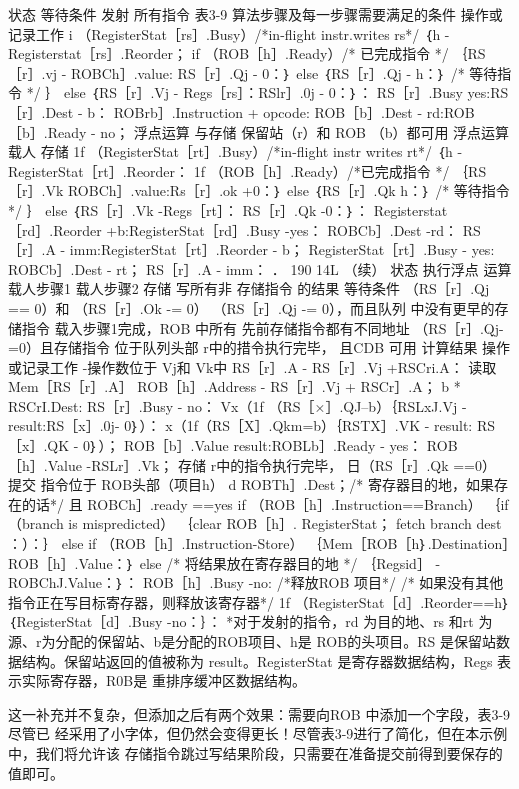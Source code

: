 状态
等待条件
发射
所有指令
表3-9 算法步骤及每一步骤需要满足的条件
操作或记录工作
i （RegisterStat［rs］.Busy）/*in-flight instr.writes rs*/
｛h - Registerstat［rs］.Reorder；
if （ROB［h］.Ready）/* 已完成指令 */
｛RS［r］.vj - ROBCh］.value: RS［r］.Qj - 0：｝
else ｛RS［r］.Qj - h：｝ /* 等待指令 */
｝ else ｛RS［r］.Vj - Regs［rs］：RSlr］.0j - 0：｝：
RS［r］.Busy  yes:RS［r］.Dest - b：
ROBrb］.Instruction + opcode: ROB［b］.Dest - rd:ROB［b］.Ready - no；
浮点运算
与存储
保留站（r）和 ROB
（b）都可用
浮点运算
载人
存储
1f （RegisterStat［rt］.Busy）/*in-flight instr writes rt*/
｛h -RegisterStat［rt］.Reorder：
1f （ROB［h］.Ready）/*已完成指令 */
｛RS［r］.Vk ROBCh］.value:Rs［r］.ok +0：｝
else ｛RS［r］.Qk h：｝ /* 等待指令*/
｝ else ｛RS［r］.Vk -Regs［rt］： RS［r］.Qk -0：｝：
Registerstat［rd］.Reorder +b:RegisterStat［rd］.Busy -yes：
ROBCb］.Dest -rd：
RS［r］.A - imm:RegisterStat［rt］.Reorder - b；
RegisterStat［rt］.Busy - yes: ROBCb］.Dest - rt；
RS［r］.A - imm：
．
190
14L
（续）
状态
执行浮点
运算
载人步骤1
载人步骤2
存储
写所有非
存储指令
的结果
等待条件
（RS［r］.Qj == 0）和
（RS［r］.Ok -= 0）
（RS［r］.Qj -= 0），而且队列
中没有更早的存储指令
载入步骤1完成，ROB 中所有
先前存储指令都有不同地址
（RS［r］.Qj-=0）且存储指令
位于队列头部
r中的措令执行完毕，
且CDB 可用
计算结果
操作或记录工作
-操作数位于 Vj和 Vk中
RS［r］.A - RS［r］.Vj +RSCri.A：
读取 Mem［RS［r］.A］
ROB［h］.Address - RS［r］.Vj + RSCr］.A；
b * RSCrI.Dest: RS［r］.Busy - no：
Vx（1f （RS［×］.QJ--b）｛RSLxJ.Vj - result:RS［x］.0j- 0｝）：
x（1f（RS［X］.Qkm=b）｛RSTX］.VK - result: RS［x］.QK - 0｝）；
ROB［b］.Value result:ROBLb］.Ready - yes：
ROB［h］.Value -RSLr］.Vk；
存储
r中的指令执行完毕，
日（RS［r］.Qk ==0）
提交
指令位于 ROB头部（项目h）
d ROBTh］.Dest；/* 寄存器目的地，如果存在的话*/
且 ROBCh］.ready ==yes
if （ROB［h］.Instruction==Branch）
｛if （branch is mispredicted）
｛clear ROB［h］. RegisterStat； fetch branch dest ：）：｝
else if （ROB［h］.Instruction-Store）
｛Mem［ROB［h｝.Destination］ROB［h］.Value：｝
else /* 将结果放在寄存器目的地 */
｛Regsid］ -ROBChJ.Value：｝：
ROB［h］.Busy -no: /*释放ROB 项目*/
/* 如果没有其他指令正在写目标寄存器，则释放该寄存器*/
1f （RegisterStat［d］.Reorder==h｝｛RegisterStat［d］.Busy -no：｝：
*对于发射的指令，rd 为目的地、rs 和rt 为源、r为分配的保留站、b是分配的ROB项目、h是 ROB的头项目。RS
是保留站数据结构。保留站返回的值被称为 result。RegisterStat 是寄存器数据结构，Regs 表示实际寄存器，R0B是
重排序缓冲区数据结构。

这一补充并不复杂，但添加之后有两个效果：需要向ROB 中添加一个字段，表3-9尽管已
经采用了小字体，但仍然会变得更长！尽管表3-9进行了简化，但在本示例中，我们将允许该
存储指令跳过写结果阶段，只需要在准备提交前得到要保存的值即可。

